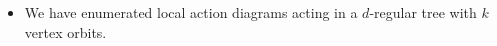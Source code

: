 \documentclass[preview]{standalone}
\begin{document}
\begin{center}
\begin{itemize} \item We have enumerated local action diagrams acting in a $d$-regular tree with $k$ vertex orbits.\end{itemize}
\end{center}
\end{document}
